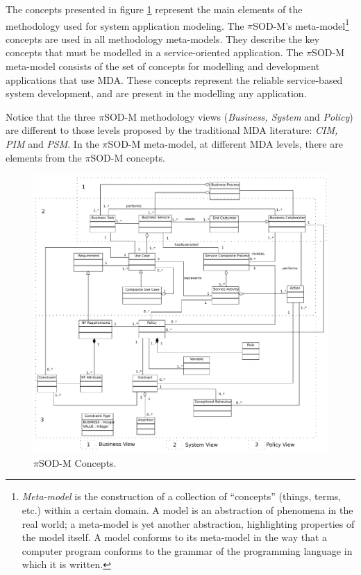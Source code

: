 
The concepts presented in figure \ref{fig:pisodm-concepts} represent the main
elements of the methodology used for system application modeling. The $\pi$SOD-M's
meta-model\footnote{\textit{Meta-model} is the construction of a collection of
``concepts'' (things, terms, etc.) within a certain domain. A model is an
abstraction of phenomena in the real world; a meta-model is yet another abstraction, highlighting properties of the model
itself. A model conforms to its meta-model in the way that a computer program
conforms to the grammar of the programming language in which it is written.}
concepts are used in all methodology meta-models. They
describe the key concepts that must be modelled in a service-oriented
application. The $\pi$SOD-M meta-model consists of the set of concepts for
modelling and development applications that use MDA. These concepts represent the reliable
service-based system development, and are present in the modelling any
application.


Notice that the three $\pi$SOD-M methodology views (\textit{Business, System}
and \textit{Policy}) are different to those levels proposed by the traditional
MDA literature: \textit{CIM, PIM} and \textit{PSM}. In the $\pi$SOD-M
meta-model, at different MDA levels, there are elements from the $\pi$SOD-M
concepts.  

\begin{figure}[ht!]
\centering
\includegraphics[width=.99\textwidth]{chapters/methodology/figs/PiSOD-M.pdf}
\caption{$\pi$SOD-M Concepts.}
\label{fig:pisodm-concepts}
\end{figure}
 
